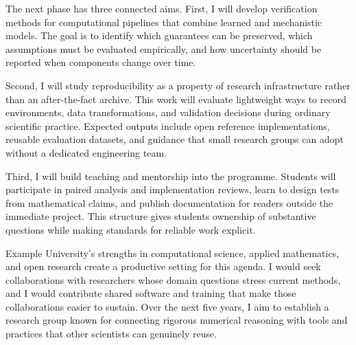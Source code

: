 \documentclass[type=research]{careerdossier-statement}
\begin{document}

The next phase has three connected aims. First, I will develop verification
methods for computational pipelines that combine learned and mechanistic
models. The goal is to identify which guarantees can be preserved, which
assumptions must be evaluated empirically, and how uncertainty should be
reported when components change over time.

Second, I will study reproducibility as a property of research infrastructure
rather than an after-the-fact archive. This work will evaluate lightweight ways
to record environments, data transformations, and validation decisions during
ordinary scientific practice. Expected outputs include open reference
implementations, reusable evaluation datasets, and guidance that small research
groups can adopt without a dedicated engineering team.

Third, I will build teaching and mentorship into the programme. Students will
participate in paired analysis and implementation reviews, learn to design tests
from mathematical claims, and publish documentation for readers outside the
immediate project. This structure gives students ownership of substantive
questions while making standards for reliable work explicit.


Example University's strengths in computational science, applied mathematics,
and open research create a productive setting for this agenda. I would seek
collaborations with researchers whose domain questions stress current methods,
and I would contribute shared software and training that make those
collaborations easier to sustain. Over the next five years, I aim to establish a
research group known for connecting rigorous numerical reasoning with tools and
practices that other scientists can genuinely reuse.
\end{document}
